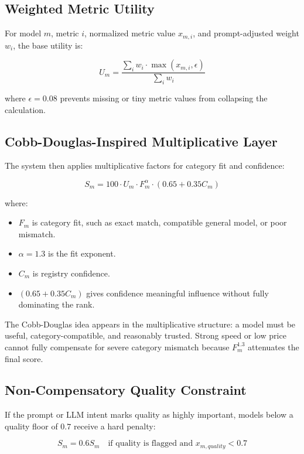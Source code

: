 \documentclass[11pt]{article}
\begin{document}
\subsection{Weighted Metric Utility}

For model $m$, metric $i$, normalized metric value $x_{m,i}$, and prompt-adjusted weight $w_i$, the base utility is:

\[
U_m = \frac{\sum_i w_i \cdot \max(x_{m,i}, \epsilon)}{\sum_i w_i}
\]

where $\epsilon = 0.08$ prevents missing or tiny metric values from collapsing the calculation.

\subsection{Cobb-Douglas-Inspired Multiplicative Layer}

The system then applies multiplicative factors for category fit and confidence:

\[
S_m = 100 \cdot U_m \cdot F_m^{\alpha} \cdot (0.65 + 0.35C_m)
\]

where:

\begin{itemize}[leftmargin=*]
  \item $F_m$ is category fit, such as exact match, compatible general model, or poor mismatch.
  \item $\alpha = 1.3$ is the fit exponent.
  \item $C_m$ is registry confidence.
  \item $(0.65 + 0.35C_m)$ gives confidence meaningful influence without fully dominating the rank.
\end{itemize}

The Cobb-Douglas idea appears in the multiplicative structure: a model must be useful, category-compatible, and reasonably trusted. Strong speed or low price cannot fully compensate for severe category mismatch because $F_m^{1.3}$ attenuates the final score.

\subsection{Non-Compensatory Quality Constraint}

If the prompt or LLM intent marks quality as highly important, models below a quality floor of $0.7$ receive a hard penalty:

\[
S_m = 0.6S_m \quad \text{if quality is flagged and } x_{m,quality} < 0.7
\]
\end{document}
